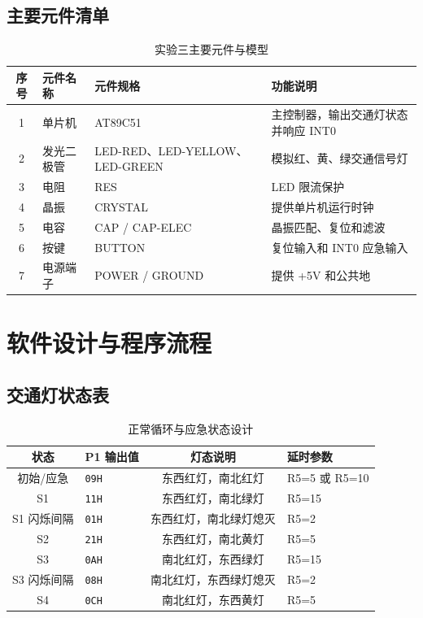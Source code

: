 \subsection{主要元件清单}
\begin{table}[H]
  \centering
  \caption{实验三主要元件与模型}
  \small
  \renewcommand{\arraystretch}{1.3}
  \begin{tabular}{cp{}p{}p{}}
    \toprule
    序号 & 元件名称 & 元件规格 & 功能说明 \\
    \midrule
    1 & 单片机 & AT89C51 & 主控制器，输出交通灯状态并响应 INT0 \\
    2 & 发光二极管 & LED-RED、LED-YELLOW、LED-GREEN & 模拟红、黄、绿交通信号灯 \\
    3 & 电阻 & RES & LED 限流保护 \\
    4 & 晶振 & CRYSTAL & 提供单片机运行时钟 \\
    5 & 电容 & CAP / CAP-ELEC & 晶振匹配、复位和滤波 \\
    6 & 按键 & BUTTON & 复位输入和 INT0 应急输入 \\
    7 & 电源端子 & POWER / GROUND & 提供 +5V 和公共地 \\
    \bottomrule
  \end{tabular}
\end{table}

\section{软件设计与程序流程}

\subsection{交通灯状态表}
\begin{table}[H]
  \centering
  \caption{正常循环与应急状态设计}
  \renewcommand{\arraystretch}{1.35}
  \begin{tabular}{clcl}
    \toprule
    状态 & P1 输出值 & 灯态说明 & 延时参数 \\
    \midrule
    初始/应急 & \texttt{09H} & 东西红灯，南北红灯 & R5=5 或 R5=10 \\
    S1 & \texttt{11H} & 东西红灯，南北绿灯 & R5=15 \\
    S1 闪烁间隔 & \texttt{01H} & 东西红灯，南北绿灯熄灭 & R5=2 \\
    S2 & \texttt{21H} & 东西红灯，南北黄灯 & R5=5 \\
    S3 & \texttt{0AH} & 南北红灯，东西绿灯 & R5=15 \\
    S3 闪烁间隔 & \texttt{08H} & 南北红灯，东西绿灯熄灭 & R5=2 \\
    S4 & \texttt{0CH} & 南北红灯，东西黄灯 & R5=5 \\
    \bottomrule
  \end{tabular}
\end{table}

